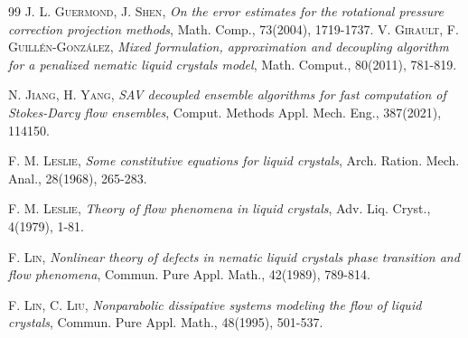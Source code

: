 \documentclass[12pt,reqno]{amsart}
\numberwithin{equation}{section}
\begin{document}
\begin{thebibliography}{99}
%
%
 \textsc{J. L. Guermond, J. Shen}, \emph{On the error estimates for the rotational pressure correction projection methods}, Math. Comp., 73(2004), 1719-1737.
%
 \textsc{V. Girault, F. Guill\'en-Gonz\'alez}, \emph{Mixed formulation, approximation and decoupling algorithm for a penalized nematic liquid crystals model}, Math. Comput., 80(2011), 781-819.





 \textsc{N. Jiang, H. Yang}, \emph{SAV decoupled ensemble algorithms for fast computation of Stokes-Darcy flow ensembles}, Comput. Methods Appl. Mech. Eng., 387(2021), 114150.



 \textsc{F. M. Leslie}, \emph{Some constitutive equations for liquid crystals}, Arch. Ration. Mech. Anal., 28(1968), 265-283. 


 \textsc{F. M. Leslie}, \emph{Theory of flow phenomena in liquid crystals}, Adv. Liq. Cryst., 4(1979), 1-81.

 \textsc{F. Lin}, \emph{Nonlinear theory of defects in nematic liquid crystals phase transition and flow phenomena}, Commun. Pure Appl. Math., 42(1989), 789-814.



 \textsc{F. Lin, C. Liu}, \emph{Nonparabolic dissipative systems modeling the flow of liquid crystals}, Commun. Pure Appl. Math., 48(1995), 501-537.


\end{thebibliography}
\end{document}
